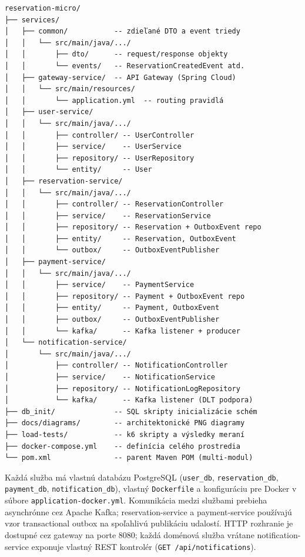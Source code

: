 \begin{verbatim}
reservation-micro/
├── services/
│   ├── common/           -- zdieľané DTO a event triedy
│   │   └── src/main/java/.../
│   │       ├── dto/      -- request/response objekty
│   │       └── events/   -- ReservationCreatedEvent atd.
│   ├── gateway-service/  -- API Gateway (Spring Cloud)
│   │   └── src/main/resources/
│   │       └── application.yml  -- routing pravidlá
│   ├── user-service/
│   │   └── src/main/java/.../
│   │       ├── controller/ -- UserController
│   │       ├── service/    -- UserService
│   │       ├── repository/ -- UserRepository
│   │       └── entity/     -- User
│   ├── reservation-service/
│   │   └── src/main/java/.../
│   │       ├── controller/ -- ReservationController
│   │       ├── service/    -- ReservationService
│   │       ├── repository/ -- Reservation + OutboxEvent repo
│   │       ├── entity/     -- Reservation, OutboxEvent
│   │       └── outbox/     -- OutboxEventPublisher
│   ├── payment-service/
│   │   └── src/main/java/.../
│   │       ├── service/    -- PaymentService
│   │       ├── repository/ -- Payment + OutboxEvent repo
│   │       ├── entity/     -- Payment, OutboxEvent
│   │       ├── outbox/     -- OutboxEventPublisher
│   │       └── kafka/      -- Kafka listener + producer
│   └── notification-service/
│       └── src/main/java/.../
│           ├── controller/ -- NotificationController
│           ├── service/    -- NotificationService
│           ├── repository/ -- NotificationLogRepository
│           └── kafka/      -- Kafka listener (DLT podpora)
├── db_init/              -- SQL skripty inicializácie schém
├── docs/diagrams/        -- architektonické PNG diagramy
├── load-tests/           -- k6 skripty a výsledky meraní
├── docker-compose.yml    -- definícia celého prostredia
└── pom.xml               -- parent Maven POM (multi-modul)
\end{verbatim}

Každá služba má vlastnú databázu PostgreSQL (\texttt{user\_db}, \texttt{reservation\_db}, \texttt{payment\_db}, \texttt{notification\_db}), vlastný \texttt{Dockerfile} a konfiguráciu pre Docker v súbore \texttt{application-docker.yml}. Komunikácia medzi službami prebieha asynchrónne cez Apache Kafka; reservation-service a payment-service používajú vzor transactional outbox na spoľahlivú publikáciu udalostí. HTTP rozhranie je dostupné cez gateway na porte 8080; každá doménová služba vrátane notification-service exponuje vlastný REST kontrolér (\texttt{GET /api/notifications}).

